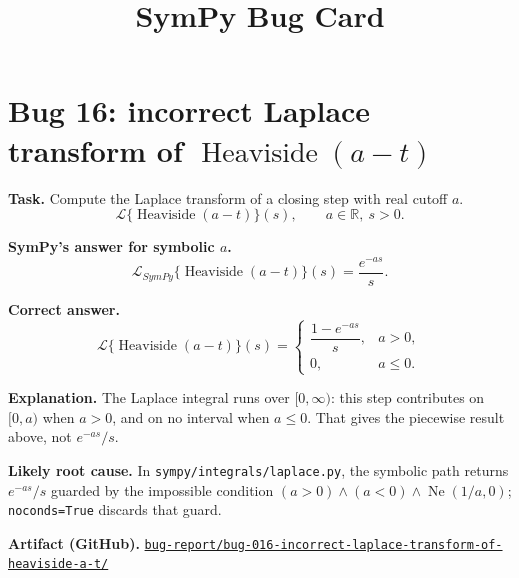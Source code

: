 \documentclass[11pt]{article}
\title{SymPy Bug Card}
\author{}
\date{}
\newcommand{\SymPy}{SymPy}
\newcommand{\artifactrepo}{https://github.com/TODO-org/TODO-repo}
\newcommand{\bugbundle}[1]{\href{\artifactrepo/tree/main/bug-report/#1}{\nolinkurl{bug-report/#1/}}}
\begin{document}
\maketitle

\section*{Bug 16: incorrect Laplace transform of \texorpdfstring{$\operatorname{Heaviside}(a-t)$}{Heaviside(a - t)}}

\begin{counterexamplebox}
\textbf{Task.} Compute the Laplace transform of a closing step with real cutoff \(a\).
\[
\mathcal{L}\{\operatorname{Heaviside}(a-t)\}(s), \qquad a\in\mathbb{R},\ s>0.
\]

\medskip
\textbf{SymPy's answer for symbolic \(a\).}
\[
\mathcal{L}_{\SymPy}\{\operatorname{Heaviside}(a-t)\}(s)
=\frac{e^{-as}}{s}.
\]

\medskip
\textbf{Correct answer.}
\[
\mathcal{L}\{\operatorname{Heaviside}(a-t)\}(s)
=
\begin{cases}
\dfrac{1-e^{-as}}{s}, & a>0,\\[6pt]
0, & a\leq 0.
\end{cases}
\]

\medskip
\textbf{Explanation.} The Laplace integral runs over \([0,\infty)\): this step contributes on \([0,a)\) when \(a>0\), and on no interval when \(a\leq 0\).  That gives the piecewise result above, not \(e^{-as}/s\).

\medskip
\textbf{Likely root cause.} In \nolinkurl{sympy/integrals/laplace.py}, the symbolic path returns \(e^{-as}/s\) guarded by the impossible condition \((a>0)\wedge(a<0)\wedge\operatorname{Ne}(1/a,0)\); \texttt{noconds=True} discards that guard.

\medskip
\textbf{Artifact (GitHub).} \bugbundle{bug-016-incorrect-laplace-transform-of-heaviside-a-t}
\end{counterexamplebox}
\end{document}
